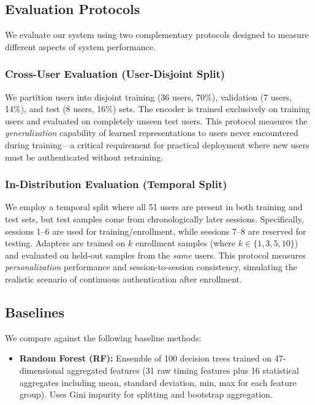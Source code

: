 \documentclass{ieeeaccess}
\begin{document}
{\subsection{Evaluation Protocols}
We evaluate our system using two complementary protocols designed to measure different aspects of system performance.

\subsubsection{Cross-User Evaluation (User-Disjoint Split)}
We partition users into disjoint training (36 users, 70\%), validation (7 users, 14\%), and test (8 users, 16\%) sets. The encoder is trained exclusively on training users and evaluated on completely unseen test users. This protocol measures the \textit{generalization} capability of learned representations to users never encountered during training---a critical requirement for practical deployment where new users must be authenticated without retraining.

\subsubsection{In-Distribution Evaluation (Temporal Split)}
We employ a temporal split where all 51 users are present in both training and test sets, but test samples come from chronologically later sessions. Specifically, sessions 1--6 are used for training/enrollment, while sessions 7--8 are reserved for testing. Adapters are trained on $k$ enrollment samples (where $k \in \{1, 3, 5, 10\}$) and evaluated on held-out samples from the \textit{same} users. This protocol measures \textit{personalization} performance and session-to-session consistency, simulating the realistic scenario of continuous authentication after enrollment.

\subsection{Baselines}
We compare against the following baseline methods:

\begin{itemize}
\item \textbf{Random Forest (RF):} Ensemble of 100 decision trees trained on 47-dimensional aggregated features (31 raw timing features plus 16 statistical aggregates including mean, standard deviation, min, max for each feature group). Uses Gini impurity for splitting and bootstrap aggregation.


\end{itemize}}
\end{document}
